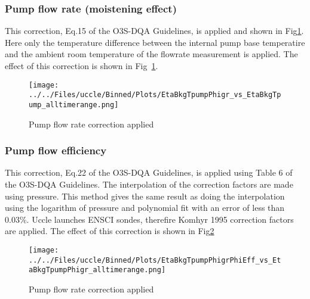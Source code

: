                \subsubsection{Pump flow rate (moistening effect)}
    This correction, Eq.15 of the O3S-DQA Guidelines, is applied and shown in Fig\ref{fig:pf_ptu}. Here only the temperature difference between the
    internal pump base temperatire and the ambient room temperature of the flowrate measurement is applied. The effect of this correction
is shown in  Fig~\ref{fig:pf_ptu}.

                        \begin{figure}
        \centering
\texttt{[image: ../../Files/uccle/Binned/Plots/EtaBkgTpumpPhigr\_vs\_EtaBkgTpump\_alltimerange.png]}
    \caption{Pump flow rate correction applied}
            \label{fig:pf_ptu}
    \end{figure}

                   \subsubsection{Pump flow efficiency}
    This correction, Eq.22 of the O3S-DQA Guidelines, is applied using Table 6 of the O3S-DQA Guidelines.
The interpolation of the correction factors are made using pressure. This method gives the same result as doing the interpolation using the logarithm of pressure
and polynomial fit with an error of less than $0.03\%$. Uccle launches ENSCI sondes, therefire Komhyr 1995 correction factors are applied.
The effect of this correction is shown in Fig\ref{fig:pf_eff}

                        \begin{figure}
        \centering
\texttt{[image: ../../Files/uccle/Binned/Plots/EtaBkgTpumpPhigrPhiEff\_vs\_EtaBkgTpumpPhigr\_alltimerange.png]}
    \caption{Pump flow rate correction applied}
            \label{fig:pf_eff}
    \end{figure}

